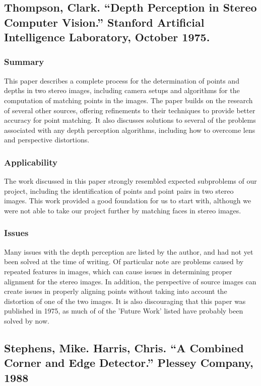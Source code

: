 \subsection{Thompson, Clark. ``Depth Perception in Stereo Computer Vision.'' Stanford Artificial Intelligence Laboratory, October 1975.}

\subsubsection{Summary}
This paper describes a complete process for the determination of points and depths in two stereo images, including camera setups and algorithms for the computation of matching points in the images. The paper builds on the research of several other sources, offering refinements to their techniques to provide better accuracy for point matching. It also discusses solutions to several of the problems associated with any depth perception algorithms, including how to overcome lens and perspective distortions.

\subsubsection{Applicability}
The work discussed in this paper strongly resembled expected subproblems of our project, including the identification of points and point pairs in two stereo images. This work provided a good foundation for us to start with, although we were not able to take our project further by matching faces in stereo images.

\subsubsection{Issues}
Many issues with the depth perception are listed by the author, and had not yet been solved at the time of writing. Of particular note are problems caused by repeated features in images, which can cause issues in determining proper alignment for the stereo images. In addition, the perspective of source images can create issues in properly aligning points without taking into account the distortion of one of the two images. It is also discouraging that this paper was published in 1975, as much of of the 'Future Work' listed have probably been solved by now.

\subsection{Stephens, Mike. Harris, Chris. ``A Combined Corner and Edge Detector.'' Plessey Company, 1988}
